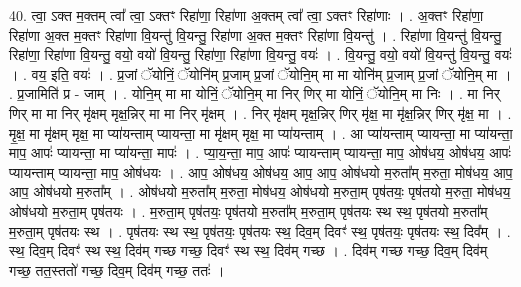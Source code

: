 \documentclass[17pt]{extarticle}
\begin{document}
40. त्वा॒ ऽक्त म॒क्तम् त्वा᳚ त्वा॒ ऽक्तꣳ रिहा॑णा॒ रिहा॑णा अ॒क्तम् त्वा᳚ त्वा॒ ऽक्तꣳ रिहा॑णाः । . अ॒क्तꣳ रिहा॑णा॒ रिहा॑णा अ॒क्त म॒क्तꣳ रिहा॑णा वि॒यन्तु॑ वि॒यन्तु॒ रिहा॑णा अ॒क्त म॒क्तꣳ रिहा॑णा वि॒यन्तु॑ । . रिहा॑णा वि॒यन्तु॑ वि॒यन्तु॒ रिहा॑णा॒ रिहा॑णा वि॒यन्तु॒ वयो॒ वयो॑ वि॒यन्तु॒ रिहा॑णा॒ रिहा॑णा वि॒यन्तु॒ वयः॑ । . वि॒यन्तु॒ वयो॒ वयो॑ वि॒यन्तु॑ वि॒यन्तु॒ वयः॑ । . वय॒ इति॒ वयः॑ । . प्र॒जां ॅयोनिं॒ ॅयोनि॑म् प्र॒जाम् प्र॒जां ॅयोनि॒म् मा मा योनि॑म् प्र॒जाम् प्र॒जां ॅयोनि॒म् मा । . प्र॒जामिति॑ प्र - जाम् । . योनि॒म् मा मा योनिं॒ ॅयोनि॒म् मा निर् णिर् मा योनिं॒ ॅयोनि॒म् मा निः । . मा निर् णिर् मा मा निर् मृ॑क्षम् मृक्ष॒न्निर् मा मा निर् मृ॑क्षम् । . निर् मृ॑क्षम् मृक्ष॒न्निर् णिर् मृ॑क्ष॒ मा मृ॑क्ष॒न्निर् णिर् मृ॑क्ष॒ मा । . मृ॒क्ष॒ मा मृ॑क्षम् मृक्ष॒ मा प्या॑यन्ताम् प्यायन्ता॒ मा मृ॑क्षम् मृक्ष॒ मा प्या॑यन्ताम् । . आ प्या॑यन्ताम् प्यायन्ता॒ मा प्या॑यन्ता॒ माप॒ आपः॑ प्यायन्ता॒ मा प्या॑यन्ता॒ मापः॑ । . प्या॒य॒न्ता॒ माप॒ आपः॑ प्यायन्ताम् प्यायन्ता॒ माप॒ ओष॑धय॒ ओष॑धय॒ आपः॑ प्यायन्ताम् प्यायन्ता॒ माप॒ ओष॑धयः । . आप॒ ओष॑धय॒ ओष॑धय॒ आप॒ आप॒ ओष॑धयो म॒रुता᳚म् म॒रुता॒ मोष॑धय॒ आप॒ आप॒ ओष॑धयो म॒रुता᳚म् । . ओष॑धयो म॒रुता᳚म् म॒रुता॒ मोष॑धय॒ ओष॑धयो म॒रुता॒म् पृष॑तयः॒ पृष॑तयो म॒रुता॒ मोष॑धय॒ ओष॑धयो म॒रुता॒म् पृष॑तयः । . म॒रुता॒म् पृष॑तयः॒ पृष॑तयो म॒रुता᳚म् म॒रुता॒म् पृष॑तयः स्थ स्थ॒ पृष॑तयो म॒रुता᳚म् म॒रुता॒म् पृष॑तयः स्थ । . पृष॑तयः स्थ स्थ॒ पृष॑तयः॒ पृष॑तयः स्थ॒ दिव॒म् दिवꣳ॑ स्थ॒ पृष॑तयः॒ पृष॑तयः स्थ॒ दिव᳚म् । . स्थ॒ दिव॒म् दिवꣳ॑ स्थ स्थ॒ दिव॑म् गच्छ गच्छ॒ दिवꣳ॑ स्थ स्थ॒ दिव॑म् गच्छ । . दिव॑म् गच्छ गच्छ॒ दिव॒म् दिव॑म् गच्छ॒ तत॒स्ततो॑ गच्छ॒ दिव॒म् दिव॑म् गच्छ॒ ततः॑ । \newline
\pagebreak
{}
\end{document}
